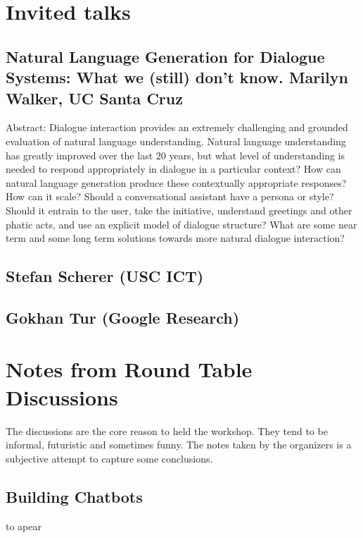 \documentclass[12pt]{article}
\begin{document}

\tableofcontents
\pagebreak


\section{Invited talks}
\subsection{Natural Language Generation for Dialogue Systems: What we (still) don't know. Marilyn Walker, UC Santa Cruz}
Abstract:  Dialogue interaction provides an extremely challenging and grounded evaluation of natural language understanding. Natural language understanding has greatly improved over the last 20 years, but what level of understanding is needed to respond appropriately in dialogue in a particular context? How can natural language generation produce these contextually appropriate responses? How can it scale? Should a conversational assistant have a persona or style? Should it entrain to the user, take the initiative, understand greetings and other phatic acts, and use an explicit model of dialogue structure? What are some near term and some
long term solutions towards more natural dialogue interaction?

\subsection{Stefan Scherer (USC ICT)}
\subsection{Gokhan Tur (Google Research)}

\section{Notes from Round Table Discussions}
The discussions are the core reason to held the workshop. 
They tend to be informal, futuristic and sometimes funny.
The notes taken by the organizers is a subjective attempt to capture some conclusions.

\subsection{Building Chatbots}
to apear
\end{document}
